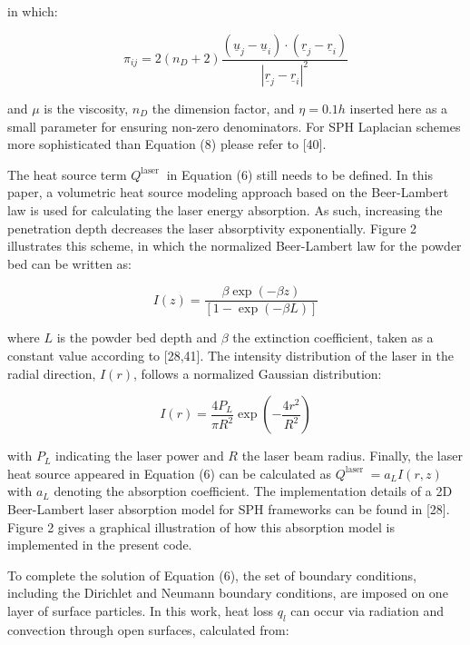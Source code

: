 \documentclass[10pt]{article}
\begin{document}
in which:


\begin{equation*}
\pi_{i j}=2\left(n_{D}+2\right) \frac{\left(\underline{u}_{j}-\underline{u}_{i}\right) \cdot\left(\underline{r}_{j}-\underline{r}_{i}\right)}{\left|\underline{r}_{j}-\underline{r}_{i}\right|^{2}} \tag{9}
\end{equation*}


and $\mu$ is the viscosity, $n_{D}$ the dimension factor, and $\eta=0.1 h$ inserted here as a small parameter for ensuring non-zero denominators. For SPH Laplacian schemes more sophisticated than Equation (8) please refer to [40].

The heat source term $Q^{\text {laser }}$ in Equation (6) still needs to be defined. In this paper, a volumetric heat source modeling approach based on the Beer-Lambert law is used for calculating the laser energy absorption. As such, increasing the penetration depth decreases the laser absorptivity exponentially. Figure 2 illustrates this scheme, in which the normalized Beer-Lambert law for the powder bed can be written as:


\begin{equation*}
I(z)=\frac{\beta \exp (-\beta z)}{[1-\exp (-\beta L)]} \tag{10}
\end{equation*}


where $L$ is the powder bed depth and $\beta$ the extinction coefficient, taken as a constant value according to [28,41]. The intensity distribution of the laser in the radial direction, $I(r)$, follows a normalized Gaussian distribution:


\begin{equation*}
I(r)=\frac{4 P_{L}}{\pi R^{2}} \exp \left(-\frac{4 r^{2}}{R^{2}}\right) \tag{11}
\end{equation*}


with $P_{L}$ indicating the laser power and $R$ the laser beam radius. Finally, the laser heat source appeared in Equation (6) can be calculated as $Q^{\text {laser }}=a_{L} I(r, z)$ with $a_{L}$ denoting the absorption coefficient. The implementation details of a 2D Beer-Lambert laser absorption model for SPH frameworks can be found in [28]. Figure 2 gives a graphical illustration of how this absorption model is implemented in the present code.

To complete the solution of Equation (6), the set of boundary conditions, including the Dirichlet and Neumann boundary conditions, are imposed on one layer of surface particles. In this work, heat loss $q_{l}$ can occur via radiation and convection through open surfaces, calculated from:
\end{document}
